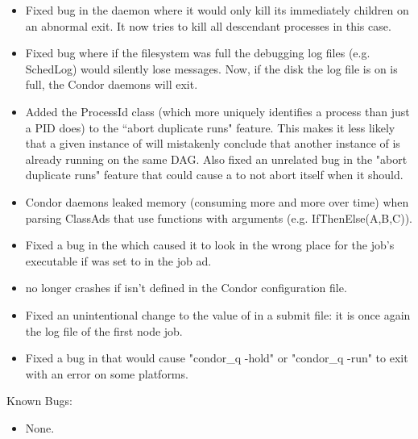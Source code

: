 \begin{itemize}

\item Fixed bug in the  daemon where it would only
kill its immediately children on an abnormal exit.  It now tries to kill
all descendant processes in this case.

\item Fixed bug where if the filesystem was full the debugging log
files (e.g. SchedLog) would silently lose messages.  Now,
if the disk the log file is on is full, the Condor daemons will 
exit.

\item Added the ProcessId class (which more uniquely identifies a
process than just a PID does) to the  ``abort duplicate
runs" feature.  This makes it less likely that a given instance of
 will mistakenly conclude that another instance of
 is already running on the same DAG.  Also fixed an
unrelated bug in the "abort duplicate runs" feature that could cause
a  to not abort itself when it should.

\item Condor daemons leaked memory (consuming more and more over time)
when parsing ClassAds that use functions with arguments
(e.g. IfThenElse(A,B,C)).

\item Fixed a bug in the  which caused it to look in the
wrong place for the job's executable if  was set
to  in the job ad.

\item {} no longer crashes if  isn't defined
in the Condor configuration file.

\item Fixed an unintentional change to the value of 
in a  submit file: it is once again the log file of
the first node job.

\item Fixed a bug in  that would cause "condor\_q -hold" or
"condor\_q -run" to exit with an error on some platforms.

\end{itemize}

\noindent Known Bugs:
\begin{itemize}

\item None.

\end{itemize}


